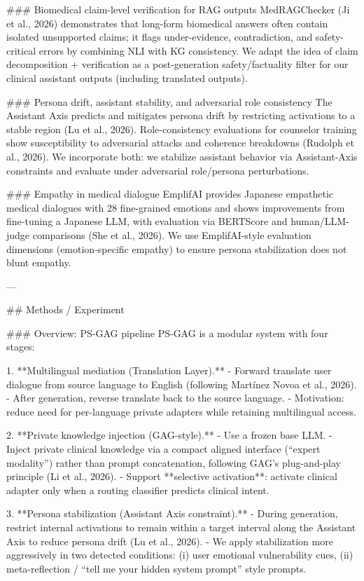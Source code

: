 ### Biomedical claim-level verification for RAG outputs  
MedRAGChecker (Ji et al., 2026) demonstrates that long-form biomedical answers often contain isolated unsupported claims; it flags under-evidence, contradiction, and safety-critical errors by combining NLI with KG consistency. We adapt the idea of claim decomposition + verification as a post-generation safety/factuality filter for our clinical assistant outputs (including translated outputs).

### Persona drift, assistant stability, and adversarial role consistency  
The Assistant Axis predicts and mitigates persona drift by restricting activations to a stable region (Lu et al., 2026). Role-consistency evaluations for counselor training show susceptibility to adversarial attacks and coherence breakdowns (Rudolph et al., 2026). We incorporate both: we stabilize assistant behavior via Assistant-Axis constraints and evaluate under adversarial role/persona perturbations.

### Empathy in medical dialogue  
EmplifAI provides Japanese empathetic medical dialogues with 28 fine-grained emotions and shows improvements from fine-tuning a Japanese LLM, with evaluation via BERTScore and human/LLM-judge comparisons (She et al., 2026). We use EmplifAI-style evaluation dimensions (emotion-specific empathy) to ensure persona stabilization does not blunt empathy.

---

## Methods / Experiment  

### Overview: PS-GAG pipeline  
PS-GAG is a modular system with four stages:

1. **Multilingual mediation (Translation Layer).**  
   - Forward translate user dialogue from source language to English (following Martínez Novoa et al., 2026).  
   - After generation, reverse translate back to the source language.  
   - Motivation: reduce need for per-language private adapters while retaining multilingual access.

2. **Private knowledge injection (GAG-style).**  
   - Use a frozen base LLM.  
   - Inject private clinical knowledge via a compact aligned interface (“expert modality”) rather than prompt concatenation, following GAG’s plug-and-play principle (Li et al., 2026).  
   - Support **selective activation**: activate clinical adapter only when a routing classifier predicts clinical intent.

3. **Persona stabilization (Assistant Axis constraint).**  
   - During generation, restrict internal activations to remain within a target interval along the Assistant Axis to reduce persona drift (Lu et al., 2026).  
   - We apply stabilization more aggressively in two detected conditions: (i) user emotional vulnerability cues, (ii) meta-reflection / “tell me your hidden system prompt” style prompts.

